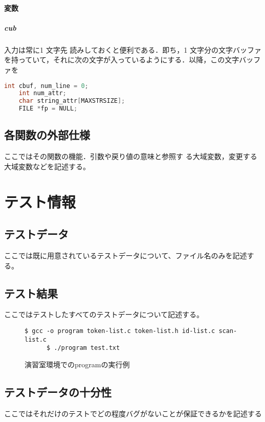 \documentclass[a4j]{jsarticle}
\begin{document}
  \paragraph{変数}
  \subparagraph{cub}
  入力は常に1 文字先
読みしておくと便利である．即ち，1 文字分の文字バッファを持っていて，それに次の文字が入っているようにする．以降，この文字バッファを

  \begin{lstlisting}[language=C,caption={各変数 in scan-list.h},label={code:var}]
    int cbuf, num_line = 0;
    int num_attr;
    char string_attr[MAXSTRSIZE];
    FILE *fp = NULL;
  \end{lstlisting}


  \subsection{各関数の外部仕様}
  ここではその関数の機能．引数や戻り値の意味と参照す
る大域変数，変更する大域変数などを記述する。\\

\section{テスト情報}
  \subsection{テストデータ}
  ここでは既に用意されているテストデータについて、ファイル名のみを記述する。\\

  \subsection{テスト結果}
  ここではテストしたすべてのテストデータについて記述する。\\
  \begin{figure}[H]
    \caption{演習室環境でのprogramの実行例}
    \label{code:exe}
    \begin{lstlisting}[backgroundcolor=\color{black},basicstyle=\color{White}]
      $ gcc -o program token-list.c token-list.h id-list.c scan-list.c
      $ ./program test.txt
    \end{lstlisting}
  \end{figure}
  \subsection{テストデータの十分性}
  ここではそれだけのテストでどの程度バグがないことが保証できるかを記述する\\
\end{document}
